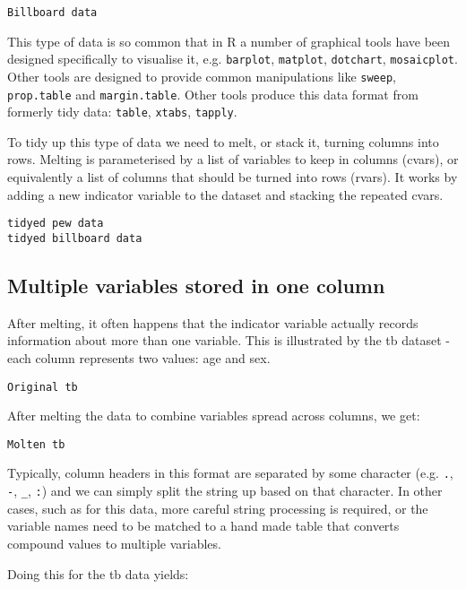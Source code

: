 \documentclass[oneside]{article}
\begin{document}
\begin{verbatim}
Billboard data
\end{verbatim}

This type of data is so common that in R a number of graphical tools have been designed specifically to visualise it, e.g. {\tt barplot}, {\tt matplot}, {\tt dotchart}, {\tt mosaicplot}. Other tools are designed to provide common manipulations like {\tt sweep}, {\tt prop.table} and {\tt margin.table}. Other tools produce this data format from formerly tidy data: {\tt table}, {\tt xtabs}, {\tt tapply}.

To tidy up this type of data we need to melt, or stack it, turning columns into rows. Melting is parameterised by a list of variables to keep in columns (cvars), or equivalently a list of columns that should be turned into rows (rvars). It works by adding a new indicator variable to the dataset and stacking the repeated cvars.

\begin{verbatim}
tidyed pew data
tidyed billboard data
\end{verbatim}

\subsection{Multiple variables stored in one column}

After melting, it often happens that the indicator variable actually records information about more than one variable. This is illustrated by the tb dataset - each column represents two values: age and sex.  

\begin{verbatim}
Original tb
\end{verbatim}

After melting the data to combine variables spread across columns, we get:

\begin{verbatim}
Molten tb
\end{verbatim}

Typically, column headers in this format are separated by some character (e.g. {\tt .}, {\tt -}, {\tt \_}, {\tt :}) and we can simply split the string up based on that character.  In other cases, such as for this data, more careful string processing is required, or the variable names need to be matched to a hand made table that converts compound values to multiple variables.

Doing this for the tb data yields:
\end{document}
